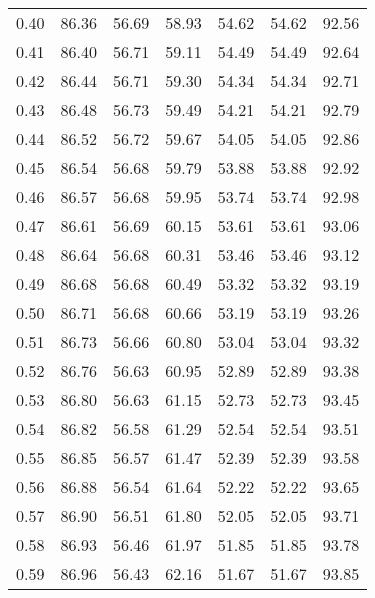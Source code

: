 \begin{tabular}{|c|c|c|c|c|c|c|}
      0.40 &     86.36 &     56.69 &      58.93 &   54.62 &      54.62 &         92.56 \\
      0.41 &     86.40 &     56.71 &      59.11 &   54.49 &      54.49 &         92.64 \\
      0.42 &     86.44 &     56.71 &      59.30 &   54.34 &      54.34 &         92.71 \\
      0.43 &     86.48 &     56.73 &      59.49 &   54.21 &      54.21 &         92.79 \\
      0.44 &     86.52 &     56.72 &      59.67 &   54.05 &      54.05 &         92.86 \\
      0.45 &     86.54 &     56.68 &      59.79 &   53.88 &      53.88 &         92.92 \\
      0.46 &     86.57 &     56.68 &      59.95 &   53.74 &      53.74 &         92.98 \\
      0.47 &     86.61 &     56.69 &      60.15 &   53.61 &      53.61 &         93.06 \\
      0.48 &     86.64 &     56.68 &      60.31 &   53.46 &      53.46 &         93.12 \\
      0.49 &     86.68 &     56.68 &      60.49 &   53.32 &      53.32 &         93.19 \\
      0.50 &     86.71 &     56.68 &      60.66 &   53.19 &      53.19 &         93.26 \\
      0.51 &     86.73 &     56.66 &      60.80 &   53.04 &      53.04 &         93.32 \\
      0.52 &     86.76 &     56.63 &      60.95 &   52.89 &      52.89 &         93.38 \\
      0.53 &     86.80 &     56.63 &      61.15 &   52.73 &      52.73 &         93.45 \\
      0.54 &     86.82 &     56.58 &      61.29 &   52.54 &      52.54 &         93.51 \\
      0.55 &     86.85 &     56.57 &      61.47 &   52.39 &      52.39 &         93.58 \\
      0.56 &     86.88 &     56.54 &      61.64 &   52.22 &      52.22 &         93.65 \\
      0.57 &     86.90 &     56.51 &      61.80 &   52.05 &      52.05 &         93.71 \\
      0.58 &     86.93 &     56.46 &      61.97 &   51.85 &      51.85 &         93.78 \\
      0.59 &     86.96 &     56.43 &      62.16 &   51.67 &      51.67 &         93.85 \\

\end{tabular}
